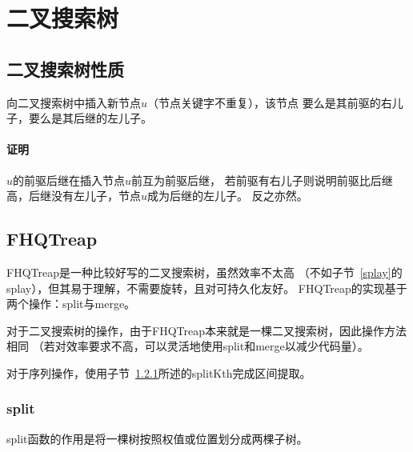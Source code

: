 \section{二叉搜索树}
\subsection{二叉搜索树性质}
\begin{property}
    向二叉搜索树中插入新节点$u$（节点关键字不重复），该节点
    要么是其前驱的右儿子，要么是其后继的左儿子。
\end{property}
\paragraph{证明} $u$的前驱后继在插入节点$u$前互为前驱后继，
若前驱有右儿子则说明前驱比后继高，后继没有左儿子，节点$u$成为后继的左儿子。
反之亦然。
\subsection{FHQTreap}\label{FHQTreap}
FHQTreap是一种比较好写的二叉搜索树，虽然效率不太高
（不如子节~\ref{splay}的splay），但其易于理解，不需要旋转，且对可持久化友好。
FHQTreap的实现基于两个操作：split与merge。

对于二叉搜索树的操作，由于FHQTreap本来就是一棵二叉搜索树，因此操作方法相同
（若对效率要求不高，可以灵活地使用split和merge以减少代码量）。

对于序列操作，使用子节~\ref{split}所述的splitKth完成区间提取。

\subsubsection{split}\label{split}

split函数的作用是将一棵树按照权值或位置划分成两棵子树。

